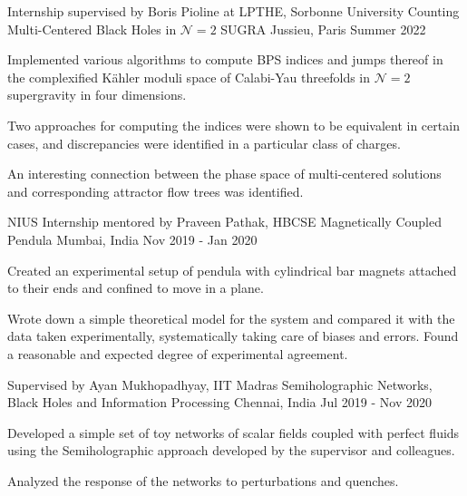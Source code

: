 \begin{cventries}
  \vspace{1ex}
  \cventry
    {Internship supervised by Boris Pioline at LPTHE, Sorbonne University} %
    {Counting Multi-Centered Black Holes in $\mathcal{N}=2$ SUGRA} %
    {Jussieu, Paris} %
    {Summer 2022} %
    {
      \begin{cvitems} %
        \item {Implemented various algorithms to compute BPS indices and jumps thereof in the complexified Kähler moduli space of Calabi-Yau threefolds in $\mathcal{N} = 2$ supergravity in four dimensions.}
        \item {Two approaches for computing the indices were shown to be equivalent in certain cases, and discrepancies were identified in a particular class of charges.}
        \item {An interesting connection between the phase space of multi-centered solutions and corresponding attractor flow trees was identified.}
      \end{cvitems}
    }

    \vspace{1ex}

\cventry
    {NIUS Internship mentored by Praveen Pathak, HBCSE} %
    {Magnetically Coupled Pendula} %
    {Mumbai, India} %
    {Nov 2019 - Jan 2020} %
    {
      \begin{cvitems} %
        \item {Created an experimental setup of pendula with cylindrical bar magnets attached to their ends and confined to move in a plane.}
        \item {Wrote down a simple theoretical model for the system and compared it with the data taken experimentally, systematically taking care of biases and errors. Found a reasonable and expected degree of experimental agreement.}
      \end{cvitems}
    }

    \vspace{1ex}

\cventry
    {Supervised by Ayan Mukhopadhyay, IIT Madras} %
    {Semiholographic Networks, Black Holes and Information Processing} %
    {Chennai, India} %
    {Jul 2019 - Nov 2020} %
    {
      \begin{cvitems} %
        \item {Developed a simple set of toy networks of scalar fields coupled with perfect fluids using the Semiholographic approach developed by the supervisor and colleagues.}
        \item {Analyzed the response of the networks to perturbations and quenches.}
      \end{cvitems}
    }


\end{cventries}

